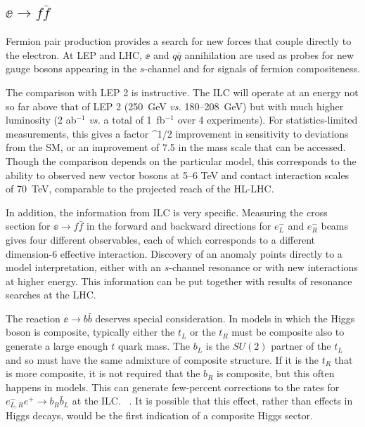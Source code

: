 \subsection{$\ee\to f\bar f$}
\label{subsec:phys_ff}

Fermion pair production provides a search for new forces that couple directly to the electron.   At LEP and LHC, $\ee$ and $q\bar q$ annihilation are used as probes for new gauge bosons appearing in the $s$-channel and for signals of fermion compositeness. 

The comparison with LEP 2 is instructive.   The ILC will operate at an energy not so far above that of LEP 2  (250~GeV {\it vs.}  180--208~GeV)  but with much higher luminosity (2 ab$^{-1}$  {\it vs.} a total of 1~fb$^{-1}$ over 4 experiments).   For statistics-limited measurements, this gives a factor 
\beq
   ^{1/2}  
\eeqn
improvement in sensitivity to deviations from the SM, or an improvement of  7.5 in the mass scale that can be accessed.   Though the comparison depends on the particular model, this corresponds to the ability to observed new vector bosons at 5--6 TeV and 
contact interaction scales of 70~TeV, comparable to  the projected reach of the HL-LHC. 

 In addition, the information from ILC is very specific.   Measuring the cross section for $\ee\to f\bar f$ in the forward and backward directions for $e^-_L$ and $e^-_R$ beams gives four  different observables, each of which corresponds to a different dimension-6 effective  interaction.   Discovery of an anomaly points directly to a model interpretation, either with an $s$-channel resonance or with new interactions at higher energy.   This information can be put together with results of resonance searches at the LHC. 

The reaction $\ee\to b\bar b$ deserves special consideration. In models in which the Higgs boson is composite, typically either the $t_L$ or the $t_R$ must be composite also to generate a large enough $t$ quark mass.    The $b_L$ is the $SU(2)$ partner of the $t_L$ and so must have the same admixture of composite structure.    If it is the $t_R$ that is more composite, it is not required that the $b_R$ is composite, but this often happens in models.  This can generate few-percent corrections to the rates for $e^-_{L,R} e^+\to b_R\bar b_L$ at the ILC.  ~\cite{Funatsu:2017nfm,YoonPeskin}.   It is possible that this effect, rather than effects in Higgs decays, would be the first indication of a composite Higgs sector. 

